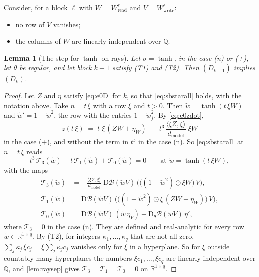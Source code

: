 \documentclass[10pt]{article}
\newtheorem{lemma}[theorem]{Lemma}
\theoremstyle{definition}
\theoremstyle{remark}
\newcommand{\R}{\mathbb{R}}
\newcommand{\Wread}{W_{\mathrm{read}}}
\newcommand{\Wwrite}{W_{\mathrm{write}}}
\newcommand{\dm}{d_{\mathrm{model}}}
\newcommand{\Der}{\mathrm{D}}
\begin{document}
Consider, for a block $\ell$ with $W = \Wread^{\ell}$ and $V = \Wwrite^{\ell}$:
\begin{itemize}[leftmargin=2.9em]
\item[(T1)] no row of $V$ vanishes;
\item[(T2)] the columns of $W$ are linearly independent over $\mathbb Q$.
\end{itemize}

\begin{lemma}[The step for $\tanh$ on rays]\label{lem:sbsteptanh}
Let $\sigma = \tanh$, in the case (n) or (+), let $\theta$ be regular, and let block $k+1$ satisfy (T1) and (T2). Then $(D_{k+1})$ implies $(D_k)$.
\end{lemma}

\begin{proof}
Let $Z$ and $\eta$ satisfy \eqref{eq:e0D} for $k$, so that \eqref{eq:sbstarall} holds, with the notation above. Take $n = t\,\xi$ with a row $\xi$ and $t > 0$. Then $\tilde w = \tanh(t\,\xi W)$ and $\tilde w' = 1 - \tilde w^2$, the row with the entries $1 - \tilde w_j^2$. By \eqref{eq:e0zdot},
\[
\dot z(t\,\xi) \;=\; t\;\xi\,(ZW + \eta_W) \;-\; t^3\,\frac{\langle\xi Z, \xi\rangle}{\dm}\;\xi W
\]
in the case (+), and without the term in $t^3$ in the case (n). So \eqref{eq:sbstarall} at $n = t\,\xi$ reads
\[
t^3\,\mathcal T_3(\tilde w) + t\,\mathcal T_1(\tilde w) + \mathcal T_0(\tilde w) = 0 \qquad\text{at } \tilde w = \tanh(t\,\xi W),
\]
with the maps
\begin{align*}
\mathcal T_3(\tilde w) &= -\frac{\langle\xi Z, \xi\rangle}{\dm}\;\Der\mathcal B(\tilde wV)\,\Big(\big((1 - \tilde w^2)\odot\xi W\big)\,V\Big),\\
\mathcal T_1(\tilde w) &= \Der\mathcal B(\tilde wV)\,\Big(\big((1 - \tilde w^2)\odot\xi\,(ZW + \eta_W)\big)\,V\Big),\\
\mathcal T_0(\tilde w) &= \Der\mathcal B(\tilde wV)\,(\tilde w\,\eta_V) + \Der_\theta\mathcal B(\tilde wV)\,\eta' ,
\end{align*}
where $\mathcal T_3 = 0$ in the case (n). They are defined and real-analytic for every row $\tilde w \in \R^{1\times q}$. By (T2), for integers $\kappa_1, \dots, \kappa_q$ that are not all zero, $\sum_j\kappa_j\,\xi c_j = \xi\sum_j\kappa_jc_j$ vanishes only for $\xi$ in a hyperplane. So for $\xi$ outside countably many hyperplanes the numbers $\xi c_1, \dots, \xi c_q$ are linearly independent over $\mathbb Q$, and \cref{lem:raysep} gives $\mathcal T_3 = \mathcal T_1 = \mathcal T_0 = 0$ on $\R^{1\times q}$.


\end{proof}
\end{document}
